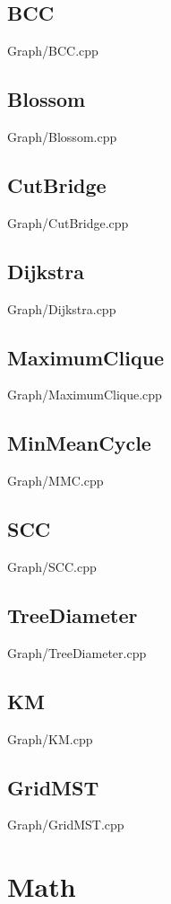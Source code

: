     \subsection{BCC}
         {Graph/BCC.cpp}
    \subsection{Blossom}
         {Graph/Blossom.cpp}
    \subsection{CutBridge}
         {Graph/CutBridge.cpp}
    \subsection{Dijkstra}
         {Graph/Dijkstra.cpp}
    \subsection{MaximumClique}
         {Graph/MaximumClique.cpp}
    \subsection{MinMeanCycle}
         {Graph/MMC.cpp}
    \subsection{SCC}
         {Graph/SCC.cpp}
    \subsection{TreeDiameter}
         {Graph/TreeDiameter.cpp}
    \subsection{KM}
         {Graph/KM.cpp}
    \subsection{GridMST}
         {Graph/GridMST.cpp}

\section{Math}
